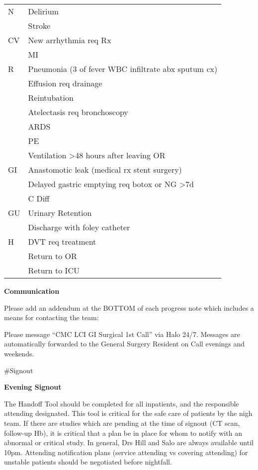 \documentclass[
]{book}
\begin{document}
\begin{longtable}[]{@{}ll@{}}
\toprule
\endhead
N & Delirium \\
& Stroke \\
CV & New arrhythmia req Rx \\
& MI \\
R & Pneumonia (3 of fever \textbar{} WBC \textbar{} infiltrate \textbar{} abx \textbar{} sputum cx) \\
& Effusion req drainage \\
& Reintubation \\
& Atelectasis req bronchoscopy \\
& ARDS \\
& PE \\
& Ventilation \textgreater48 hours after leaving OR \\
GI & Anastomotic leak (medical rx \textbar{} stent \textbar{} surgery) \\
& Delayed gastric emptying req botox or NG \textgreater7d \\
& C Diff \\
GU & Urinary Retention \\
& Discharge with foley catheter \\
H & DVT req treatment \\
& Return to OR \\
& Return to ICU \\
\bottomrule
\end{longtable}

\textbf{Communication}

Please add an addendum at the BOTTOM of each progress note which includes a means for contacting the team:

Please message ``CMC LCI GI Surgical 1st Call'' via Halo 24/7. Messages are automatically forwarded to the General Surgery Resident on Call evenings and weekends.

\#Signout

\textbf{Evening Signout}

The Handoff Tool should be completed for all inpatients, and the responsible attending designated. This tool is critical for the safe care of patients by the nigh team. If there are studies which are pending at the time of signout (CT scan, follow-up Hb), it is critical that a plan be in place for whom to notify with an abnormal or critical study. In general, Drs Hill and Salo are always available until 10pm. Attending notification plans (service attending vs covering attending) for unstable patients should be negotiated before nightfall.
\end{document}
